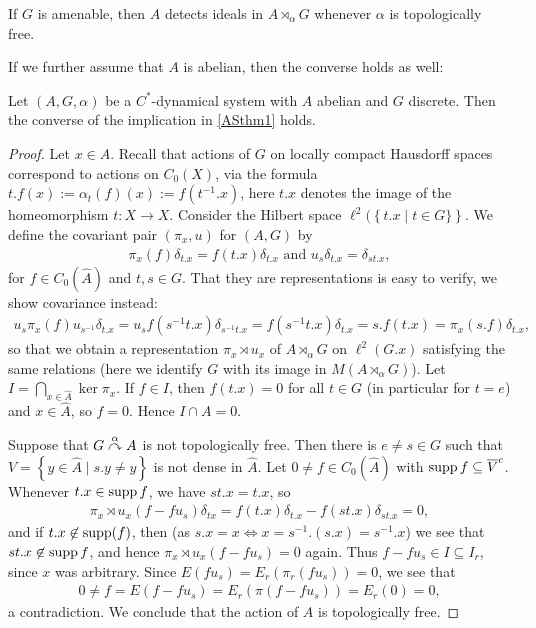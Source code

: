 \begin{corollary}
	If $G$ is amenable, then $A$ detects ideals in $A \rtimes_\alpha G$ whenever $\alpha$ is topologically free.
\end{corollary}

If we further assume that $A$ is abelian, then the converse holds as well:
\begin{theorem}
	Let $(A,G,\alpha)$ be a $C^*$-dynamical system with $A$ abelian and $G$ discrete. Then the converse of the implication in \cref{ASthm1} holds.
	\label{ASthm2}
\end{theorem}
\begin{proof}
	Let $x \in \hat A$. Recall that  actions of $G$ on locally compact Hausdorff spaces correspond to actions on $C_0(X)$, via the formula $t.f(x) :=  \alpha_t(f)(x) := f(t^{-1}.x)$, here $t.x$ denotes the image of the homeomorphism $t \colon X \to X$. Consider the Hilbert space $\ell^2(\left\{ t.x \mid t \in G\} \right\}$. We define the covariant pair $(\pi_x,u)$ for $(A,G)$ by
	\begin{align*}
		\pi_x(f) \delta_{t.x} = f(t.x) \delta_{t.x} \text{ and } u_s \delta_{t.x} = \delta_{st.x},
	\end{align*}
	for $f \in C_0(\hat A)$ and $t,s \in G$. That they are representations is easy to verify, we show covariance instead:
	\begin{align*}
		u_s \pi_x(f) u_{s^{-1}} \delta_{t.x} = u_{s} f(s^{-1}t.x)\delta_{s^{-1}t.x} = f(s^{-1}t.x) \delta_{t.x} = s.f(t.x) = \pi_x(s.f)\delta_{t.x},
	\end{align*}
	so that we obtain a representation $\pi_x \rtimes u_x$ of $A \rtimes_\alpha G$ on $\ell^2(G.x)$ satisfying the same relations (here we identify $G$ with its image in $M(A \rtimes_\alpha G)$). Let $I = \bigcap_{x \in \hat A} \ker \pi_{x}$. If $f \in I$, then $f(t.x) = 0$ for all $t \in G$ (in particular for $t=e$) and $x \in \hat A$, so $f = 0$. Hence $I \cap A = 0$.
	
	Suppose that $G \stackrel{\alpha}{\curvearrowright} A$ is not topologically free. Then there is $e \neq s \in G$ such that $V=\left\{ y \in \hat A \mid s.y \neq y \right\}$ is not dense in $\hat A$. Let $0 \neq f \in C_0(\hat A)$ with $\operatorname{supp} f \subseteq \overline{V}^c$. Whenever $t.x \in \operatorname{supp} f$, we have $st.x = t.x$, so
	\begin{align*}
		\pi_x\rtimes u_x(f-fu_s)\delta_{tx} = f(t.x) \delta_{t.x} - f(st.x)\delta_{st.x}= 0,
	\end{align*}
	and if $t.x \not \in \operatorname{supp}(f)$, then (as $s.x=x \iff x = s^{-1}.(s.x)=s^{-1}.x$) we see that $st.x \not \in \operatorname{supp} f$, and hence $\pi_{x} \rtimes u_x (f-f u_s) = 0$ again. Thus $f-f u_s \in I \subseteq I_r$, since $x$ was arbitrary. Since $E(f u_s) = E_r(\pi_r(fu_s)
) =0$, we see that 
	\begin{align*}
		0 \neq f = E(f-fu_s) = E_r (\pi(f-fu_s))= E_r(0) =0,
	\end{align*}
	a contradiction. We conclude that the action of $A$ is topologically free.
\end{proof}


